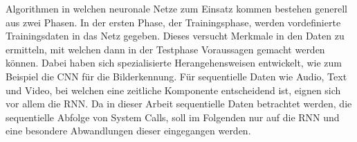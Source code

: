         Algorithmen in welchen neuronale Netze zum Einsatz kommen bestehen generell aus zwei Phasen. 
        In der ersten Phase, der Trainingsphase, werden vordefinierte Trainingsdaten in das Netz gegeben.
        Dieses versucht Merkmale in den Daten zu ermitteln, mit welchen dann in der Testphase Voraussagen gemacht werden können.
        Dabei haben sich spezialisierte Herangehensweisen entwickelt, wie zum Beispiel die \ac{CNN} für die Bilderkennung. 
        Für sequentielle Daten wie Audio, Text und Video, bei welchen eine zeitliche Komponente entscheidend ist, eignen sich vor allem die \ac{RNN}.
        Da in dieser Arbeit sequentielle Daten betrachtet werden, die sequentielle Abfolge von System Calls, soll im Folgenden nur auf die \ac{RNN} und eine besondere Abwandlungen dieser eingegangen werden.
